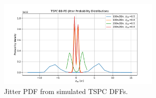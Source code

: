 
	\begin{figure}[htb!]
	    \centering
		\includegraphics[width=0.7\textwidth, angle=0]{./figs/jitter_pdfs.pdf}
		\caption{Jitter PDF from simulated TSPC DFFs.}
		\label{fig:tspc_dff_sim}
	\end{figure}


